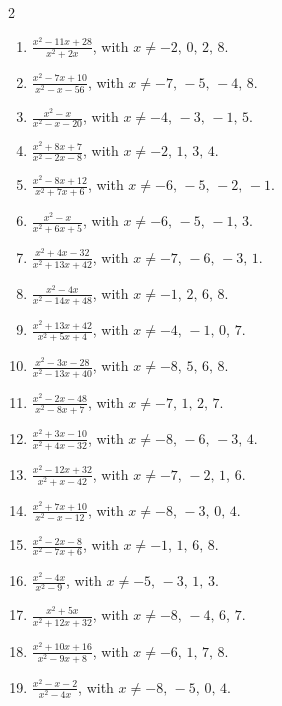 \documentclass[11pt,oneside]{book}
\begin{document}
\begin{multicols}{2}
\begin{enumerate}[leftmargin=*,label=\textbf{K\arabic*.},itemsep=0.45\baselineskip]
\item $\displaystyle \frac{x^{2} - 11 x + 28}{x^{2} + 2 x}$, with $x\ne -2,\,0,\,2,\,8$.
\item $\displaystyle \frac{x^{2} - 7 x + 10}{x^{2} - x - 56}$, with $x\ne -7,\,-5,\,-4,\,8$.
\item $\displaystyle \frac{x^{2} - x}{x^{2} - x - 20}$, with $x\ne -4,\,-3,\,-1,\,5$.
\item $\displaystyle \frac{x^{2} + 8 x + 7}{x^{2} - 2 x - 8}$, with $x\ne -2,\,1,\,3,\,4$.
\item $\displaystyle \frac{x^{2} - 8 x + 12}{x^{2} + 7 x + 6}$, with $x\ne -6,\,-5,\,-2,\,-1$.
\item $\displaystyle \frac{x^{2} - x}{x^{2} + 6 x + 5}$, with $x\ne -6,\,-5,\,-1,\,3$.
\item $\displaystyle \frac{x^{2} + 4 x - 32}{x^{2} + 13 x + 42}$, with $x\ne -7,\,-6,\,-3,\,1$.
\item $\displaystyle \frac{x^{2} - 4 x}{x^{2} - 14 x + 48}$, with $x\ne -1,\,2,\,6,\,8$.
\item $\displaystyle \frac{x^{2} + 13 x + 42}{x^{2} + 5 x + 4}$, with $x\ne -4,\,-1,\,0,\,7$.
\item $\displaystyle \frac{x^{2} - 3 x - 28}{x^{2} - 13 x + 40}$, with $x\ne -8,\,5,\,6,\,8$.
\item $\displaystyle \frac{x^{2} - 2 x - 48}{x^{2} - 8 x + 7}$, with $x\ne -7,\,1,\,2,\,7$.
\item $\displaystyle \frac{x^{2} + 3 x - 10}{x^{2} + 4 x - 32}$, with $x\ne -8,\,-6,\,-3,\,4$.
\item $\displaystyle \frac{x^{2} - 12 x + 32}{x^{2} + x - 42}$, with $x\ne -7,\,-2,\,1,\,6$.
\item $\displaystyle \frac{x^{2} + 7 x + 10}{x^{2} - x - 12}$, with $x\ne -8,\,-3,\,0,\,4$.
\item $\displaystyle \frac{x^{2} - 2 x - 8}{x^{2} - 7 x + 6}$, with $x\ne -1,\,1,\,6,\,8$.
\item $\displaystyle \frac{x^{2} - 4 x}{x^{2} - 9}$, with $x\ne -5,\,-3,\,1,\,3$.
\item $\displaystyle \frac{x^{2} + 5 x}{x^{2} + 12 x + 32}$, with $x\ne -8,\,-4,\,6,\,7$.
\item $\displaystyle \frac{x^{2} + 10 x + 16}{x^{2} - 9 x + 8}$, with $x\ne -6,\,1,\,7,\,8$.
\item $\displaystyle \frac{x^{2} - x - 2}{x^{2} - 4 x}$, with $x\ne -8,\,-5,\,0,\,4$.

\end{enumerate}
\end{multicols}
\end{document}
